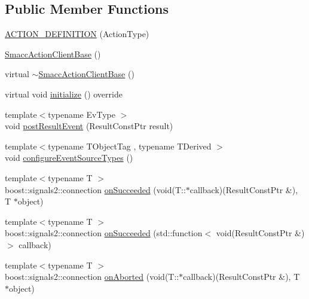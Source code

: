 \subsection*{Public Member Functions}
\begin{DoxyCompactItemize}
\item 
\hyperlink{classsmacc_1_1client__bases_1_1SmaccActionClientBase_a2936b800b46ac557550cbeda563209b3}{A\+C\+T\+I\+O\+N\+\_\+\+D\+E\+F\+I\+N\+I\+T\+I\+ON} (Action\+Type)
\item 
\hyperlink{classsmacc_1_1client__bases_1_1SmaccActionClientBase_a942113f29871c3e2c3fff9e951500805}{Smacc\+Action\+Client\+Base} ()
\item 
virtual \hyperlink{classsmacc_1_1client__bases_1_1SmaccActionClientBase_aa6daf2d88aa6254e5a5c10b2c2152fad}{$\sim$\+Smacc\+Action\+Client\+Base} ()
\item 
virtual void \hyperlink{classsmacc_1_1client__bases_1_1SmaccActionClientBase_a72967f255f85e35718a1e1b0b48c38ff}{initialize} () override
\item 
{\footnotesize template$<$typename Ev\+Type $>$ }\\void \hyperlink{classsmacc_1_1client__bases_1_1SmaccActionClientBase_ad84470e029cc996685f44ad0d4062c29}{post\+Result\+Event} (Result\+Const\+Ptr result)
\item 
{\footnotesize template$<$typename T\+Object\+Tag , typename T\+Derived $>$ }\\void \hyperlink{classsmacc_1_1client__bases_1_1SmaccActionClientBase_a8d8e9c0be98ab5bf0ed666fd2fa0892b}{configure\+Event\+Source\+Types} ()
\item 
{\footnotesize template$<$typename T $>$ }\\boost\+::signals2\+::connection \hyperlink{classsmacc_1_1client__bases_1_1SmaccActionClientBase_af6d77c27d21b2e4f621f53c5f1df088b}{on\+Succeeded} (void(T\+::$\ast$callback)(Result\+Const\+Ptr \&), T $\ast$object)
\item 
{\footnotesize template$<$typename T $>$ }\\boost\+::signals2\+::connection \hyperlink{classsmacc_1_1client__bases_1_1SmaccActionClientBase_a92053df4ebfd0e49bbbd4ba191bf3975}{on\+Succeeded} (std\+::function$<$ void(Result\+Const\+Ptr \&)$>$ callback)
\item 
{\footnotesize template$<$typename T $>$ }\\boost\+::signals2\+::connection \hyperlink{classsmacc_1_1client__bases_1_1SmaccActionClientBase_a75c58162621a705bfd11efdf068eb06b}{on\+Aborted} (void(T\+::$\ast$callback)(Result\+Const\+Ptr \&), T $\ast$object)

\end{DoxyCompactItemize}
